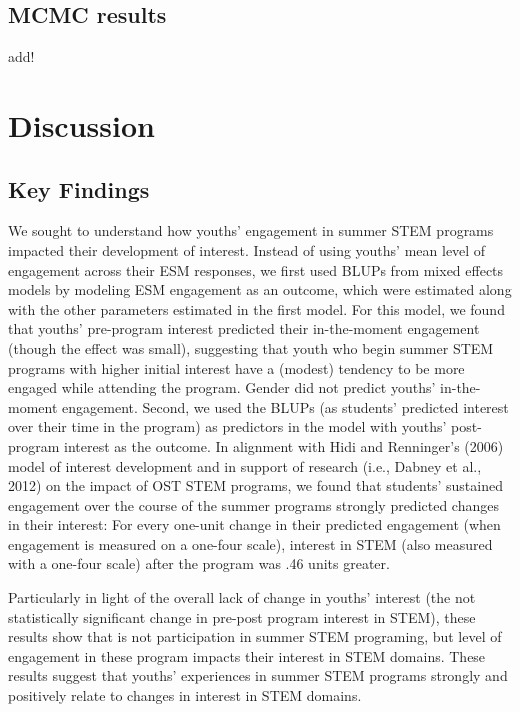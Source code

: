 \documentclass[man]{apa6}
\theoremstyle{definition}
\theoremstyle{definition}
\theoremstyle{definition}
\theoremstyle{remark}
\begin{document}
\subsection{MCMC results}\label{mcmc-results}

add!

\section{Discussion}\label{discussion}

\subsection{Key Findings}\label{key-findings}

We sought to understand how youths' engagement in summer STEM programs
impacted their development of interest. Instead of using youths' mean
level of engagement across their ESM responses, we first used BLUPs from
mixed effects models by modeling ESM engagement as an outcome, which
were estimated along with the other parameters estimated in the first
model. For this model, we found that youths' pre-program interest
predicted their in-the-moment engagement (though the effect was small),
suggesting that youth who begin summer STEM programs with higher initial
interest have a (modest) tendency to be more engaged while attending the
program. Gender did not predict youths' in-the-moment engagement.
Second, we used the BLUPs (as students' predicted interest over their
time in the program) as predictors in the model with youths'
post-program interest as the outcome. In alignment with Hidi and
Renninger's (2006) model of interest development and in support of
research (i.e., Dabney et al., 2012) on the impact of OST STEM programs,
we found that students' sustained engagement over the course of the
summer programs strongly predicted changes in their interest: For every
one-unit change in their predicted engagement (when engagement is
measured on a one-four scale), interest in STEM (also measured with a
one-four scale) after the program was .46 units greater.

Particularly in light of the overall lack of change in youths' interest
(the not statistically significant change in pre-post program interest
in STEM), these results show that is not participation in summer STEM
programing, but level of engagement in these program impacts their
interest in STEM domains. These results suggest that youths' experiences
in summer STEM programs strongly and positively relate to changes in
interest in STEM domains.
\end{document}
